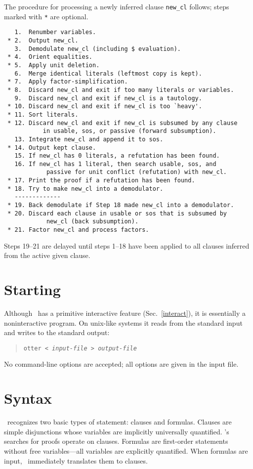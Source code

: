 \documentclass[11pt]{article}
\begin{document}
\noindent
The procedure for processing a newly inferred clause \verb:new_cl: follows;
steps marked with \verb:*: are optional.

{\small
\begin{verbatim}
   1.  Renumber variables.
 * 2.  Output new_cl.
   3.  Demodulate new_cl (including $ evaluation).
 * 4.  Orient equalities.
 * 5.  Apply unit deletion.
   6.  Merge identical literals (leftmost copy is kept).
 * 7.  Apply factor-simplification.
 * 8.  Discard new_cl and exit if too many literals or variables.
   9.  Discard new_cl and exit if new_cl is a tautology.
 * 10. Discard new_cl and exit if new_cl is too `heavy'.
 * 11. Sort literals.
 * 12. Discard new_cl and exit if new_cl is subsumed by any clause
           in usable, sos, or passive (forward subsumption).
   13. Integrate new_cl and append it to sos.
 * 14. Output kept clause.
   15. If new_cl has 0 literals, a refutation has been found.
   16. If new_cl has 1 literal, then search usable, sos, and
            passive for unit conflict (refutation) with new_cl.
 * 17. Print the proof if a refutation has been found.
 * 18. Try to make new_cl into a demodulator.
   -------------
 * 19. Back demodulate if Step 18 made new_cl into a demodulator.
 * 20. Discard each clause in usable or sos that is subsumed by
            new_cl (back subsumption).
 * 21. Factor new_cl and process factors.
\end{verbatim}
}
\noindent
Steps 19--21 are delayed until steps 1--18 have been applied to all
clauses inferred from the active given clause.

\section{Starting \otter}

Although \otter\ has a primitive interactive feature
(Sec.~\ref{interact}), it is essentially a noninteractive program.  On
{\sc unix}-like systems it reads from the standard input and writes to
the standard output:
\begin{verse}
\tt otter < \it input-file \tt > \it output-file
\end{verse}
No command-line options are accepted; all options are given in the
input file.

\section{Syntax}

\otter\ recognizes two basic types of statement: clauses and formulas.
Clauses are simple disjunctions whose variables are implicitly
universally quantified.  \otter's searches for proofs operate on
clauses.  Formulas are first-order statements without free variables---all
variables are explicitly quantified.  When formulas are input, \otter\
immediately translates them to clauses.
\end{document}
